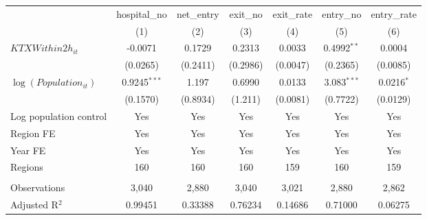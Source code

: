 \begingroup
\centering
\begin{tabular}{lcccccc}
   \toprule
                            & hospital\_no   & net\_entry  & exit\_no  & exit\_rate  & entry\_no     & entry\_rate \\    
                            & (1)            & (2)         & (3)       & (4)         & (5)           & (6)\\  
   \midrule 
   $KTXWithin2h_{it}$       & -0.0071        & 0.1729      & 0.2313    & 0.0033      & 0.4992$^{**}$ & 0.0004\\   
                            & (0.0265)       & (0.2411)    & (0.2986)  & (0.0047)    & (0.2365)      & (0.0085)\\   
   $\log(Population_{it})$  & 0.9245$^{***}$ & 1.197       & 0.6990    & 0.0133      & 3.083$^{***}$ & 0.0216$^{*}$\\   
                            & (0.1570)       & (0.8934)    & (1.211)   & (0.0081)    & (0.7722)      & (0.0129)\\   
   Log population control   & Yes            & Yes         & Yes       & Yes         & Yes           & Yes\\  
   Region FE                & Yes            & Yes         & Yes       & Yes         & Yes           & Yes\\  
   Year FE                  & Yes            & Yes         & Yes       & Yes         & Yes           & Yes\\  
   Regions                  & 160            & 160         & 160       & 159         & 160           & 159\\  
    \\
   Observations             & 3,040          & 2,880       & 3,040     & 3,021       & 2,880         & 2,862\\  
   Adjusted R$^2$           & 0.99451        & 0.33388     & 0.76234   & 0.14686     & 0.71000       & 0.06275\\  
   \bottomrule
\end{tabular}
\par\endgroup
